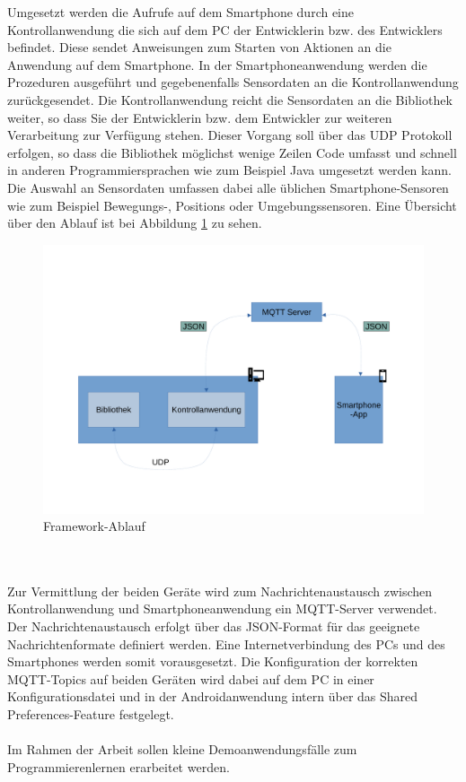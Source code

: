 \documentclass[11pt,a4paper]{article} %
\begin{document}
Umgesetzt werden die Aufrufe auf dem Smartphone durch eine Kontrollanwendung die sich auf dem PC der Entwicklerin bzw. des Entwicklers befindet.
Diese sendet Anweisungen zum Starten von Aktionen an die Anwendung auf dem Smartphone.
In der Smartphoneanwendung werden die Prozeduren ausgeführt und gegebenenfalls Sensordaten an die Kontrollanwendung zurückgesendet.
Die Kontrollanwendung reicht die Sensordaten an die Bibliothek weiter, so dass Sie der Entwicklerin bzw. dem Entwickler zur weiteren Verarbeitung zur Verfügung stehen.
Dieser Vorgang soll über das UDP Protokoll erfolgen, so dass die Bibliothek möglichst wenige Zeilen Code umfasst und schnell in anderen Programmiersprachen wie zum Beispiel Java umgesetzt werden kann.
Die Auswahl an Sensordaten umfassen dabei alle üblichen Smartphone-Sensoren wie zum Beispiel Bewegungs-, Positions oder Umgebungssensoren. 
Eine Übersicht über den Ablauf ist bei Abbildung \ref{fig:Ablauf} zu sehen.
\begin{figure}[htbp]
  \centering
  \includegraphics[width=.9\textwidth]{ablauf}
  \caption{Framework-Ablauf}
  \label{fig:Ablauf}
  \end{figure}
\\\\
Zur Vermittlung der beiden Geräte wird zum Nachrichtenaustausch zwischen Kontrollanwendung und Smartphoneanwendung ein MQTT-Server verwendet. \cite{mqtt}
Der Nachrichtenaustausch erfolgt über das JSON-Format \cite{json} für das geeignete Nachrichtenformate definiert werden.
Eine Internetverbindung des PCs und des Smartphones werden somit vorausgesetzt.
Die Konfiguration der korrekten MQTT-Topics auf beiden Geräten wird dabei auf dem PC in einer Konfigurationsdatei und in der Androidanwendung intern über das Shared Preferences-Feature festgelegt.
\\\\
Im Rahmen der Arbeit sollen kleine Demoanwendungsfälle zum Programmierenlernen erarbeitet werden.

\printbibliography
\end{document}
